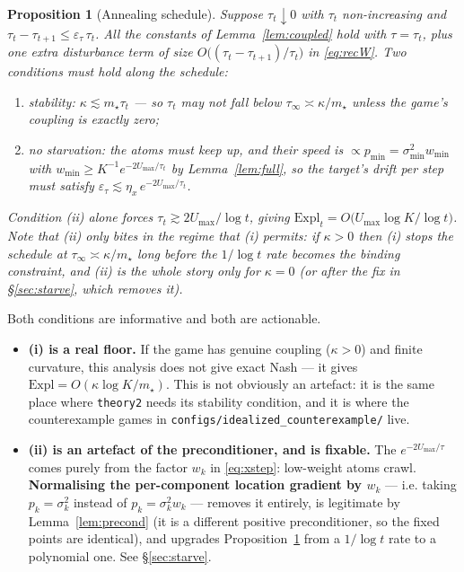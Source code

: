 \documentclass[11pt,a4paper]{article}
\theoremstyle{plain}
\newtheorem{proposition}[theorem]{Proposition}
\theoremstyle{definition}
\theoremstyle{remark}
\newcommand{\Expl}{\mathrm{Expl}}
\newcommand{\eps}{\varepsilon}
\begin{document}
\begin{proposition}[Annealing schedule]\label{prop:anneal}
Suppose $\tau_t\downarrow0$ with $\tau_t$ non-increasing and
$\tau_t-\tau_{t+1}\le \eps_\tau\,\tau_t$. All the constants of
Lemma~\ref{lem:coupled} hold with $\tau=\tau_t$, plus one extra disturbance term
of size $O\big((\tau_t-\tau_{t+1})/\tau_t\big)$ in \eqref{eq:recW}. Two conditions
must hold along the schedule:
\begin{enumerate}[label=(\roman*),leftmargin=*]
\item \emph{stability}: $\kappa\lesssim m_\star\tau_t$ --- so $\tau_t$ may not fall
below $\tau_\infty\asymp\kappa/m_\star$ unless the game's coupling is exactly zero;
\item \emph{no starvation}: the atoms must keep up, and their speed is
$\propto p_{\min}=\sigma^2_{\min}w_{\min}$ with $w_{\min}\ge K^{-1}e^{-2U_{\max}/\tau_t}$
by Lemma~\ref{lem:full}, so the target's drift per step must satisfy
$\eps_\tau \lesssim \eta_x\,e^{-2U_{\max}/\tau_t}$.
\end{enumerate}
Condition (ii) alone forces $\tau_t\gtrsim 2U_{\max}/\log t$, giving
$\Expl_t = O\big(U_{\max}\log K/\log t\big)$. Note that (ii) only bites in the regime
that (i) permits: if $\kappa>0$ then (i) stops the schedule at $\tau_\infty\asymp\kappa/m_\star$
long before the $1/\log t$ rate becomes the binding constraint, and (ii) is the whole
story only for $\kappa=0$ (or after the fix in \S\ref{sec:starve}, which removes it).
\end{proposition}

\noindent Both conditions are informative and both are actionable.

\begin{itemize}[leftmargin=*]
\item \textbf{(i) is a real floor.} If the game has genuine coupling
($\kappa>0$) and finite curvature, this analysis does not give exact Nash --- it gives
$\Expl = O(\kappa\log K/m_\star)$. This is not obviously an artefact: it is the same
place where \texttt{theory2} needs its stability condition, and it is where the
counterexample games in \texttt{configs/idealized\_counterexample/} live.
\item \textbf{(ii) is an artefact of the preconditioner, and is fixable.} The
$e^{-2U_{\max}/\tau}$ comes purely from the factor $w_k$ in \eqref{eq:xstep}:
low-weight atoms crawl. \textbf{Normalising the per-component location gradient by
$w_k$} --- i.e. taking $p_k=\sigma_k^2$ instead of $p_k=\sigma_k^2 w_k$ --- removes
it entirely, is legitimate by Lemma~\ref{lem:precond} (it is a different positive
preconditioner, so the fixed points are identical), and upgrades
Proposition~\ref{prop:anneal} from a $1/\log t$ rate to a polynomial one. See
\S\ref{sec:starve}.
\end{itemize}
\end{document}
